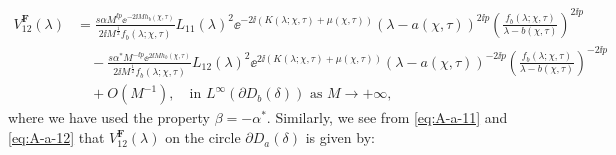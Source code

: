 \begin{equation}
\begin{split}
V^{\mathbf{F}}_{12}(\lambda) &=
\frac{s \alpha M^{\ii p} \ee^{-2\ii M {h}_b(\chi,\tau)} }{2\ii M^{\frac{1}{2}} f_b(\lambda;\chi,\tau)} L_{11}(\lambda)^2 \ee^{-2\ii ( K(\lambda;\chi,\tau) +\mu(\chi,\tau) ) }    (\lambda-a(\chi,\tau))^{2\ii p}  \left( \frac{f_b(\lambda;\chi,\tau)}{\lambda-b(\chi,\tau)} \right)^{2\ii p}\\
&\quad - 
\frac{s \alpha^* M^{-\ii p} \ee^{2\ii M {h}_b(\chi,\tau)} }{2\ii M^{\frac{1}{2}} f_b(\lambda;\chi,\tau)} L_{12}(\lambda)^2 \ee^{2\ii (K(\lambda;\chi,\tau) + \mu(\chi,\tau) )}  (\lambda-a(\chi,\tau))^{-2\ii p} \left( \frac{f_b(\lambda;\chi,\tau)}{\lambda-b(\chi,\tau)} \right)^{-2\ii p} \\
&\quad+ O(M^{-1}),\quad \text{in $L^\infty(\partial D_b(\delta))$ as $M\to+\infty$},
\end{split}
\label{eq:V-F-12-b}
\end{equation}
where we have used the property $\beta=-\alpha^*$. Similarly, we see from \eqref{eq:A-a-11} and \eqref{eq:A-a-12} that $V^{\mathbf{F}}_{12}(\lambda)$ on the circle $\partial D_a(\delta)$ is given by:
